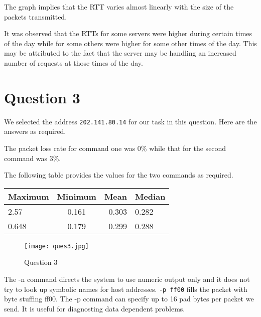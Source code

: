 \documentclass{article}
\begin{document}
	The graph implies that the RTT varies almost linearly with the size of the packets transmitted.

	It was observed that the RTTs for some servers were higher during certain times of the day while for some others were higher for some other times of the day. This may be attributed to the fact that the server may be handling an increased number of requests at those times of the day. 

	\section*{Question 3}

	We selected the address \texttt{202.141.80.14} for our task in this question. Here are the answers as required.

		The packet loss rate for command one was 0\% while that for the second command was 3\%.

		The following table provides the values for the two commands as required. 
		\vspace{0.5cm}

		\begin{tabular}{|l|c|r|p{3cm}|}
 			\hline
			Maximum & Minimum & Mean & Median\\
			\hline
 			2.57 & 0.161 & 0.303 & 0.282\\
 			\hline
 			0.648 & 0.179 & 0.299 & 0.288\\
 			\hline
		\end{tabular}
		\vspace{0.5cm}

	\begin{figure}[h!]

	\begin{center}

	\texttt{[image: ques3.jpg]}
	\caption{Question 3}

	\end{center}

	\end{figure}

	The -n command directs the system to use numeric output only and it does not try to look up symbolic names for host addresses. \texttt{-p ff00} fills the packet with byte stuffing ff00. The -p command can specify up to 16 pad bytes per packet we send. It is useful for diagnosting data dependent problems.
\end{document}
